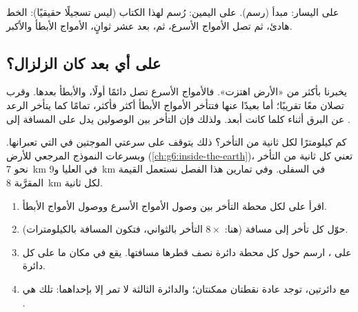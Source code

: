 \begin{omfigure}
{\small على اليسار: مبدأ  (رسم). على اليمين: 
رُسم لهذا الكتاب (ليس تسجيلًا حقيقيًا): الخط هادئ، ثم تصل الأمواج
الأسرع، ثم، بعد عشر ثوانٍ، الأمواج الأبطأ والأكبر.}
\label{fig:g7:earthquakes:seismometer}
\end{omfigure}

\subsection*{على أي بعد كان الزلزال؟}

يخبرنا  بأكثر من «الأرض اهتزت». فالأمواج الأسرع تصل دائمًا
أولًا، والأبطأ بعدها. وقرب  تصلان معًا تقريبًا؛ أما بعيدًا عنها
فتتأخر الأمواج الأبطأ أكثر فأكثر، تمامًا كما يتأخر الرعد عن البرق
أثناء  كلما كانت  أبعد. ولذلك فإن التأخر بين الوصولين
يدل على المسافة إلى .

كم كيلومترًا لكل ثانية من التأخر؟ ذلك يتوقف على سرعتي الموجتين في
 التي تعبرانها. وبسرعات النموذج المرجعي للأرض
(\cref{ch:g6:inside-the-earth})، تعني كل ثانية من التأخر نحو \qty{7}{km}
في  العليا و\qty{9}{km} في  السفلى. وفي تمارين هذا الفصل
نستعمل القيمة المقرَّبة \qty{8}{km} لكل ثانية.

\begin{method}\label{met:g7:earthquakes:three-circles}
\begin{enumerate}
  \item اقرأ على  لكل محطة التأخر بين وصول الأمواج الأسرع
        ووصول الأمواج الأبطأ.
  \item حوّل كل تأخر إلى مسافة (هنا: $8 \times$ التأخر بالثواني، فتكون
        المسافة بالكيلومترات).
  \item على ، ارسم حول كل محطة دائرة نصف قطرها مسافتها.  يقع في مكان ما على كل دائرة.
  \item مع دائرتين، توجد عادة نقطتان ممكنتان؛ والدائرة الثالثة لا تمر إلا
        بإحداهما: تلك هي .
\end{enumerate}
\end{method}

